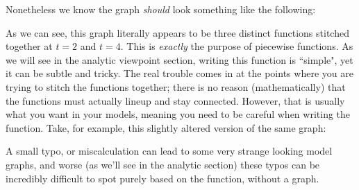 \documentclass{ximeraXloud}
\begin{document}
Nonetheless we know the graph \textit{should} look something like the following:
\begin{center}
\end{center}

As we can see, this graph literally appears to be three distinct functions stitched together at $t = 2$ and $t=4$. This is \textit{exactly} the purpose of piecewise functions. As we will see in the analytic viewpoint section, writing this function is ``simple", yet it can be subtle and tricky. The real trouble comes in at the points where you are trying to stitch the functions together; there is no reason (mathematically) that the functions must actually lineup and stay connected. However, that is usually what you want in your models, meaning you need to be careful when writing the function. Take, for example, this slightly altered version of the same graph:

\begin{center}
\end{center}
A small typo, or miscalculation can lead to some very strange looking model graphs, and worse (as we'll see in the analytic section) these typos can be incredibly difficult to spot purely based on the function, without a graph.
\end{document}
